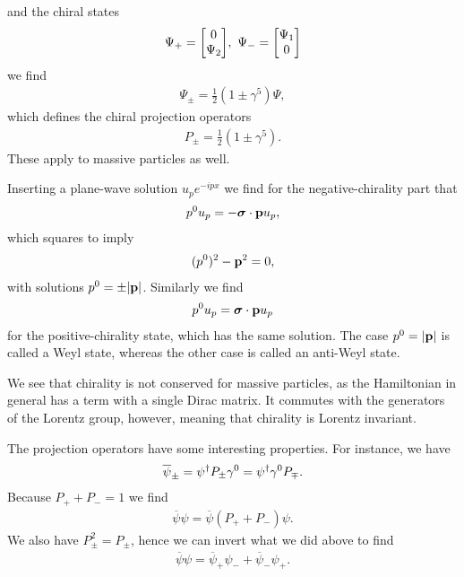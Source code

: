and the chiral states
\begin{align*}
	\Psi_{+} = \mqty[
		0 \\
		\Psi_{2}
	],\ \Psi_{-} = \mqty[
		\Psi_{1} \\
		0
	]
\end{align*}
we find
\begin{align*}
	\Psi_{\pm} = \frac{1}{2}(1 \pm \gamma^{5})\Psi,
\end{align*}
which defines the chiral projection operators
\begin{align*}
	P_{\pm} =  \frac{1}{2}(1 \pm \gamma^{5}).
\end{align*}
These apply to massive particles as well.

Inserting a plane-wave solution $u_{p}e^{-ipx}$ we find for the negative-chirality part that
\begin{align*}
	p^{0}u_{p} = -\vb*{\sigma}\cdot\vb{p}u_{p},
\end{align*}
which squares to imply
\begin{align*}
	(p^{0})^{2} - \vb{p}^{2} = 0,
\end{align*}
with solutions $p^{0} = \pm\abs{\vb{p}}$. Similarly we find
\begin{align*}
	p^{0}u_{p} = \vb*{\sigma}\cdot\vb{p}u_{p}
\end{align*}
for the positive-chirality state, which has the same solution. The case $p^{0} = \abs{\vb{p}}$ is called a Weyl state, whereas the other case is called an anti-Weyl state.

We see that chirality is not conserved for massive particles, as the Hamiltonian in general has a term with a single Dirac matrix. It commutes with the generators of the Lorentz group, however, meaning that chirality is Lorentz invariant.

The projection operators have some interesting properties. For instance, we have
\begin{align*}
	\overline{\psi}_{\pm} = \psi^{\dagger} P_{\pm}\gamma^{0} = \psi^{\dagger} \gamma^{0}P_{\mp}.
\end{align*}
Because $P_{+} + P_{-} = 1$ we find
\begin{align*}
	\overline{\psi}\psi = \overline{\psi}(P_{+} + P_{-})\psi.
\end{align*}
We also have $P_{\pm}^{2} = P_{\pm}$, hence we can invert what we did above to find
\begin{align*}
	\overline{\psi}\psi = \overline{\psi}_{+}\psi_{-} + \overline{\psi}_{-}\psi_{+}.
\end{align*}

